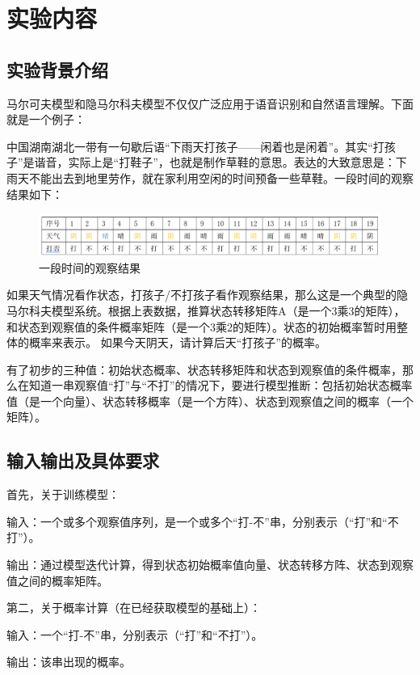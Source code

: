 \documentclass[12pt,AutoFakeBold,a4paper]{article}
\begin{document}
\section{实验内容}
\subsection{实验背景介绍}
马尔可夫模型和隐马尔科夫模型不仅仅广泛应用于语音识别和自然语言理解。下面就是一个例子：

中国湖南湖北一带有一句歇后语“下雨天打孩子——闲着也是闲着”。其实“打孩子”是谐音，实际上是“打鞋子”，也就是制作草鞋的意思。表达的大致意思是：下雨天不能出去到地里劳作，就在家利用空闲的时间预备一些草鞋。一段时间的观察结果如下：
\begin{figure}[H]
\centering
\includegraphics[scale=0.8]{figures/pic1.png}

\caption{一段时间的观察结果}
\label{fig:pic1}
\end{figure}
如果天气情况看作状态，打孩子/不打孩子看作观察结果，那么这是一个典型的隐马尔科夫模型系统。根据上表数据，推算状态转移矩阵A（是一个3乘3的矩阵），和状态到观察值的条件概率矩阵（是一个3乘2的矩阵）。状态的初始概率暂时用整体的概率来表示。
如果今天阴天，请计算后天“打孩子”的概率。

有了初步的三种值：初始状态概率、状态转移矩阵和状态到观察值的条件概率，那么在知道一串观察值“打”与“不打”的情况下，要进行模型推断：包括初始状态概率值（是一个向量）、状态转移概率（是一个方阵）、状态到观察值之间的概率（一个矩阵）。

\subsection{输入输出及具体要求}
首先，关于训练模型：

输入：一个或多个观察值序列，是一个或多个“打-不”串，分别表示（“打”和“不打”）。

输出：通过模型迭代计算，得到状态初始概率值向量、状态转移方阵、状态到观察值之间的概率矩阵。
\newline

第二，关于概率计算（在已经获取模型的基础上）：

输入：一个“打-不”串，分别表示（“打”和“不打”）。

输出：该串出现的概率。
\newline
\end{document}

